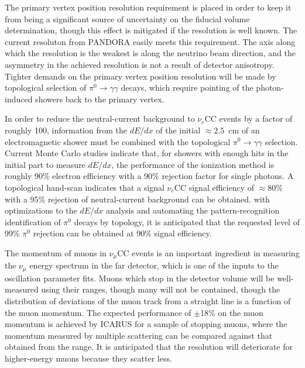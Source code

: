 The primary vertex position resolution requirement is placed in order
to keep it from being a significant source of uncertainty on the
fiducial volume determination, though this effect is mitigated if the
resolution is well known.  The current resoluton from PANDORA easily
meets this requirement.  The axis along which the resolution is the
weakest is along the neutrino beam direction, and the asymmetry in the
achieved resolution is not a result of detector anisotropy.  Tighter
demands on the primary vertex position resolution will be made by
topological selection of $\pi^0\rightarrow\gamma\gamma$ decays, which
require pointing of the photon-induced showers back to the primary
vertex.

In order to reduce the neutral-current background to $\nu_e$CC events
by a factor of roughly 100, information from the $dE/dx$ of the
initial $\approx 2.5$~cm of an electromagnetic shower must be combined
with the topological $\pi^0\rightarrow\gamma\gamma$
selection\cite{docdb-6954}.  Current Monte Carlo studies indicate
that, for showers with enough hits in the initial part to measure
$dE/dx$, the performance of the ionization method is roughly 90\%
electron efficiency with a 90\% rejection factor for single photons.
A topological hand-scan indicates that a signal $\nu_e$CC signal
efficiency of $\approx 80$\% with a 95\% rejection of neutral-current
background can be obtained.  with optimizations to the $dE/dx$
analysis and automating the pattern-recognition identification of
$\pi^0$ decays by topology, it is anticipated that the requested level
of 99\% $\pi^0$ rejection can be obtained at 90\% signal efficiency.

The momentum of muons in $\nu_\mu$CC events is an important ingredient
in measuring the $\nu_\mu$ energy spectrum in the far detector, which
is one of the inputs to the oscillation parameter fits.  Muons which
stop in the detector volume will be well-measured using their ranges,
though many will not be contained, though the distribution of
deviations of the muon track from a straight line is a function of the
muon momentum.  The expected performance of $\pm$18\% on the muon
momentum is achieved by ICARUS for a sample of stopping muons, where
the momentum measured by multiple scattering can be compared against
that obtained from the range.  It is anticipated that the resolution
will deteriorate for higher-energy muons because they scatter less.

